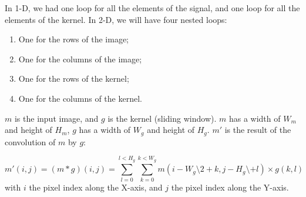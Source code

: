 \documentclass[english,a4paper,12pt,oneside]{article}
\begin{document}
 In 1-D, we had one loop for all the elements of the signal, and one loop for all the elements of the kernel. 
 In 2-D, we will have four nested loops:
 \begin{enumerate}
 \item One for the rows of the image;
 \item One for the columns of the image;
 \item One for the rows of the kernel;
 \item One for the columns of the kernel.
 \end{enumerate}
 
 
 
$m$ is the input image, and $g$ is the kernel (sliding window). 
$m$  has a width of $W_m$ and height of $H_m$,
$g$  has a width of $W_g$ and height of $H_g$.
$m'$ is the result of the convolution of $m$ by $g$: %

$$
m'(i,j) = (m * g)(i,j) = \sum^{l < H_g}_{l=0}\sum^{k < W_g}_{k=0} m(i - W_g \setminus 2 + k, j - H_g \setminus + l) \times g(k,l)
$$
with $i$ the pixel index along the X-axis, and $j$ the pixel index along the Y-axis.
 
\end{document}
